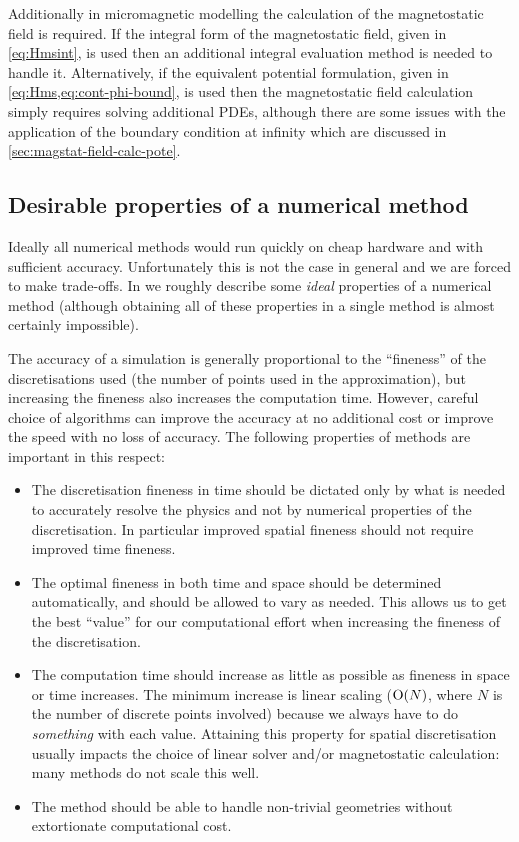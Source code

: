 Additionally in micromagnetic modelling the calculation of the magnetostatic field is required.
If the integral form of the magnetostatic field, given in \cref{eq:Hmsint}, is used then an additional integral evaluation method is needed to handle it.
Alternatively, if the equivalent potential formulation, given in \cref{eq:Hms,eq:cont-phi-bound}, is used then the magnetostatic field calculation simply requires solving additional PDEs, although there are some issues with the application of the boundary condition at infinity which are discussed in \cref{sec:magstat-field-calc-pote}.


\subsection{Desirable properties of a numerical method}
\label{sec:desir-prop-numer}

Ideally all numerical methods would run quickly on cheap hardware and with sufficient accuracy.
Unfortunately this is not the case in general and we are forced to make trade-offs.
In  we roughly describe some \emph{ideal} properties of a numerical method (although obtaining all of these properties in a single method is almost certainly impossible).

The accuracy of a simulation is generally proportional to the ``fineness''  of the discretisations used (\ie the number of points used in the approximation), but increasing the fineness also increases the computation time.
However, careful choice of algorithms can improve the accuracy at no additional cost or improve the speed with no loss of accuracy.
The following properties of methods are important in this respect:
\begin{itemize}
\item The discretisation fineness in time should be dictated only by what is needed to accurately resolve the physics and not by numerical properties of the discretisation.
  In particular improved spatial fineness should not require improved time fineness.

\item The optimal fineness in both time and space should be determined automatically, and should be allowed to vary as needed.
  This allows us to get the best ``value'' for our computational effort when increasing the fineness of the discretisation.

\item The computation time should increase as little as possible as fineness in space or time increases.
  The minimum increase is linear scaling ($\mathrm{O}{\left( N \right)}$, where $N$ is the number of discrete points involved) because we always have to do \emph{something} with each value.
  Attaining this property for spatial discretisation usually impacts the choice of linear solver and/or magnetostatic calculation: many methods do not scale this well.

\item The method should be able to handle non-trivial geometries without extortionate computational cost.
\end{itemize}

